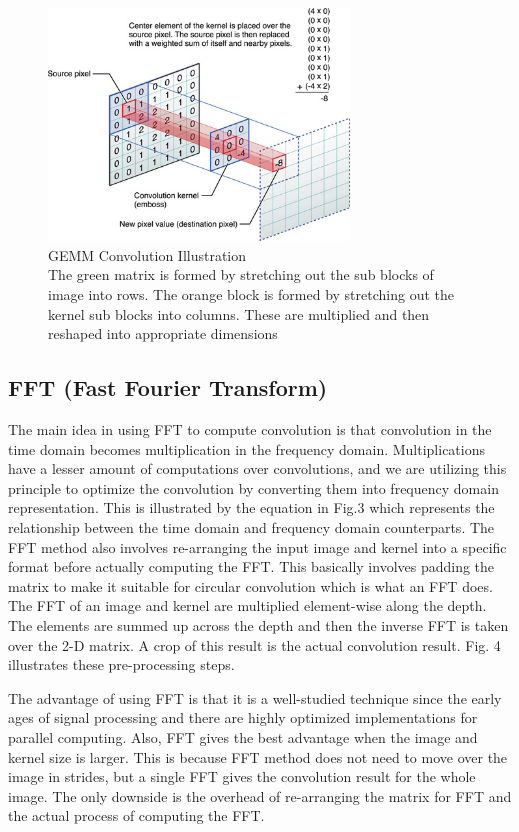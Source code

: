 \documentclass[sigconf]{acmart}
\begin{document}
\begin{figure}[h] 
	\includegraphics[width=8cm]{images/SpatialConvolution.png}
	\caption {GEMM Convolution Illustration \\ The green matrix is formed by stretching out the sub blocks of image into rows. The orange block is formed by stretching out the kernel sub blocks into columns. These are multiplied and then reshaped into appropriate dimensions}
	\label{GEMMConvolutionIllustration}
\end{figure}

\subsection{FFT (Fast Fourier Transform)}
The main idea in using FFT to compute convolution is that convolution in the time domain becomes multiplication in the frequency domain. Multiplications have a lesser amount  of computations over convolutions, and we are utilizing this principle to optimize the convolution by converting them into frequency domain representation. This is illustrated by the equation in Fig.3 which represents the relationship between the time domain and frequency domain counterparts. 
The FFT method also involves re-arranging the input image and kernel into a specific format before actually computing the FFT. This basically involves padding the matrix to make it suitable for circular convolution which is what an FFT does. The FFT of an image and kernel are multiplied element-wise along the depth. The elements are summed up across the depth and then the inverse FFT is taken over the 2-D matrix. A crop of this 
result is the actual convolution result. Fig. 4 illustrates these pre-processing steps.

The advantage of using FFT is that it is a well-studied technique since the early ages of signal processing and there are highly optimized implementations for parallel computing. Also, FFT gives the best advantage when the image and kernel size is larger. This is because FFT method does not need to move over the image in strides, but a single FFT gives the convolution result for the whole image. The only downside is the overhead of re-arranging the matrix for FFT and the actual process of computing the FFT.
\end{document}
